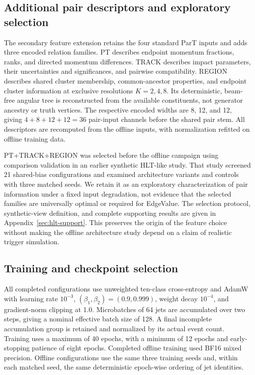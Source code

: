 \subsection{Additional pair descriptors and exploratory selection}
\label{sec:selected-relations}

The secondary feature extension retains the four standard ParT inputs and
adds three encoded relation families. PT describes endpoint momentum
fractions, ranks, and directed momentum differences. TRACK describes
impact parameters, their uncertainties and significances, and pairwise
compatibility. REGION describes shared cluster membership, common-ancestor
properties, and endpoint cluster information at exclusive resolutions
$K=2,4,8$. Its deterministic, beam-free angular tree is reconstructed from
the available constituents, not generator ancestry or truth vertices.
The respective encoded widths are 8, 12, and 12, giving
$4+8+12+12=36$ pair-input channels before the shared pair stem.
All descriptors are recomputed from the offline inputs, with normalization
refitted on offline training data.

PT+TRACK+REGION was selected before the offline campaign using comparison
validation in an earlier synthetic HLT-like study. That study screened 21
shared-bias configurations and examined architecture variants and controls
with three matched seeds. We retain it as an exploratory characterization
of pair information under a fixed input degradation, not evidence that
the selected families are universally optimal or required for EdgeValue.
The selection protocol, synthetic-view definition, and complete supporting
results are given in Appendix~\ref{sec:hlt-support}. This preserves the
origin of the feature choice without making the offline architecture study
depend on a claim of realistic trigger simulation.

\subsection{Training and checkpoint selection}
\label{sec:training-protocol}

All completed configurations use unweighted ten-class cross-entropy and
AdamW with learning rate $10^{-3}$, $(\beta_1,\beta_2)=(0.9,0.999)$,
weight decay $10^{-4}$, and gradient-norm clipping at 1.0. Microbatches of
64 jets are accumulated over two steps, giving a nominal effective batch
size of 128. A final incomplete accumulation group is retained and
normalized by its actual event count. Training uses a maximum of 40 epochs,
with a minimum of 12 epochs and early-stopping patience of eight epochs.
Completed offline training used BF16 mixed precision. Offline configurations
use the same three training seeds and, within each matched seed, the same
deterministic epoch-wise ordering of jet identities.

